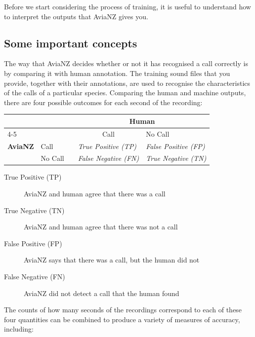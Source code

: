 \documentclass{article}
\begin{document}
Before we start considering the process of training, it is useful to understand how to interpret the outputs that AviaNZ gives you. 

\subsection{Some important concepts}\label{sec:metrics}

The way that AviaNZ decides whether or not it has recognised a call correctly is by comparing it with human annotation. The training sound files that you provide, together with their annotations, are used to recognise the characteristics of the calls of a particular species. Comparing the human and machine outputs, there are four possible outcomes for each second of the recording:

\begin{center}
\begin{tabular}{lllll}
&          &  & \multicolumn{2}{c}{\textbf{Human}}   \\
\cmidrule(lr){4-5}
             &          &  & \multicolumn{1}{c}{Call}                                               & No Call                                                               \\
 \textbf{AviaNZ}                  &\vline \hspace{0.25cm}Call     &  & \textit{True Positive (TP)}  & \textit{False Positive (FP)} \\
                  &\vline \hspace{0.25cm}No Call &  & \textit{False Negative (FN)} & \textit{True Negative (TN)}  \\
\end{tabular}
\end{center}

\begin{description}
\item[True Positive (TP)] AviaNZ and human agree that there was a call 
\item[True Negative (TN)] AviaNZ and human agree that there was not a call
\item[False Positive (FP)] AviaNZ says that there was a call, but the human did not
\item[False Negative (FN)] AviaNZ did not detect a call that the human found
\end{description}

The counts of how many seconds of the recordings correspond to each of these four quantities can be combined to produce a variety of measures of accuracy, including:
\end{document}
